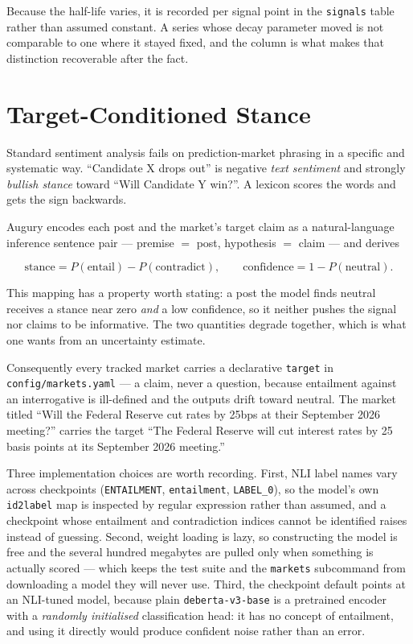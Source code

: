 \documentclass[11pt]{article}
\newcommand{\code}[1]{\texttt{\small #1}}
\begin{document}
Because the half-life varies, it is recorded per signal point in the
\code{signals} table rather than assumed constant. A series whose decay
parameter moved is not comparable to one where it stayed fixed, and the column
is what makes that distinction recoverable after the fact.

\section{Target-Conditioned Stance}
\label{sec:stance}

Standard sentiment analysis fails on prediction-market phrasing in a specific
and systematic way. ``Candidate X drops out'' is negative \emph{text sentiment}
and strongly \emph{bullish stance} toward ``Will Candidate Y win?''. A lexicon
scores the words and gets the sign backwards.

Augury encodes each post and the market's target claim as a natural-language
inference sentence pair --- premise $=$ post, hypothesis $=$ claim --- and
derives

\begin{equation}
\text{stance} = P(\text{entail}) - P(\text{contradict}),
\qquad
\text{confidence} = 1 - P(\text{neutral}).
\end{equation}

This mapping has a property worth stating: a post the model finds neutral
receives a stance near zero \emph{and} a low confidence, so it neither pushes
the signal nor claims to be informative. The two quantities degrade together,
which is what one wants from an uncertainty estimate.

Consequently every tracked market carries a declarative \code{target} in
\code{config/markets.yaml} --- a claim, never a question, because entailment
against an interrogative is ill-defined and the outputs drift toward neutral.
The market titled ``Will the Federal Reserve cut rates by 25bps at their
September 2026 meeting?'' carries the target ``The Federal Reserve will cut
interest rates by 25 basis points at its September 2026 meeting.''

Three implementation choices are worth recording. First, NLI label names vary
across checkpoints (\code{ENTAILMENT}, \code{entailment}, \code{LABEL\_0}), so
the model's own \code{id2label} map is inspected by regular expression rather
than assumed, and a checkpoint whose entailment and contradiction indices cannot
be identified raises instead of guessing. Second, weight loading is lazy, so
constructing the model is free and the several hundred megabytes are pulled only
when something is actually scored --- which keeps the test suite and the
\code{markets} subcommand from downloading a model they will never use. Third,
the checkpoint default points at an NLI-tuned model, because plain
\code{deberta-v3-base} is a pretrained encoder with a \emph{randomly initialised}
classification head: it has no concept of entailment, and using it directly
would produce confident noise rather than an error.
\end{document}
